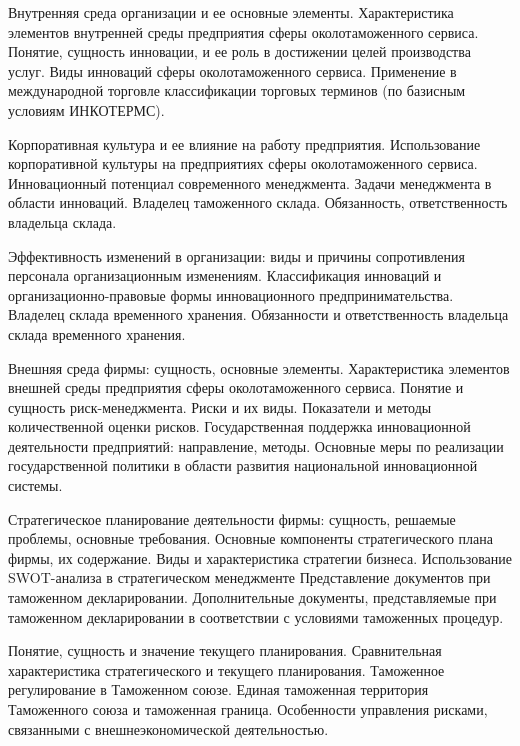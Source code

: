 \documentclass[
	11pt,
	a4paper,
	]
	{article}
\begin{document}
\bigskip

\noindent{} 
	{
		Внутренняя среда организации и ее основные элементы. Характеристика элементов внутренней среды предприятия сферы околотаможенного сервиса.
	}{
		Понятие, сущность инновации, и ее роль в достижении целей производства услуг. Виды инноваций сферы околотаможенного сервиса.
	}{
		Применение в международной торговле классификации торговых терминов (по базисным условиям ИНКОТЕРМС).
	}

\bigskip

\noindent{} 
	{
		Корпоративная культура и ее влияние на работу предприятия. Использование корпоративной культуры на предприятиях сферы околотаможенного сервиса.
	}{
		Инновационный потенциал современного менеджмента. Задачи менеджмента в области инноваций.
	}{
		Владелец таможенного склада. Обязанность, ответственность владельца склада.
	}

\bigskip

\noindent{} 
	{
		Эффективность изменений в организации: виды и причины сопротивления персонала организационным изменениям.
	}{
		Классификация инноваций и организационно-правовые формы инновационного предпринимательства.
	}{
		Владелец склада временного хранения. Обязанности и ответственность владельца склада временного хранения.
	}

\bigskip

\noindent{} 
	{
		Внешняя среда фирмы: сущность, основные элементы. Характеристика элементов внешней среды предприятия сферы околотаможенного сервиса.
	}{
		Понятие и сущность риск-менеджмента. Риски и их виды. Показатели и методы количественной оценки рисков.
	}{
		Государственная поддержка инновационной деятельности предприятий: направление, методы. Основные меры по реализации государственной политики в области развития национальной инновационной системы.
	}

\bigskip

\noindent{} 
	{
		Стратегическое планирование деятельности фирмы: сущность, решаемые проблемы, основные требования. Основные компоненты стратегического плана фирмы, их содержание.
	}{
		Виды и характеристика стратегии бизнеса. Использование SWOT-анализа в стратегическом менеджменте
	}{
		Представление документов при таможенном декларировании. Дополнительные документы, представляемые при таможенном декларировании в соответствии с условиями таможенных процедур.
	}

\bigskip

\noindent{} 
	{
		Понятие, сущность и значение текущего планирования. Сравнительная характеристика стратегического и текущего планирования.
	}{
		Таможенное регулирование в Таможенном союзе. Единая таможенная территория Таможенного союза и таможенная граница.
	}{
		Особенности управления рисками, связанными с внешнеэкономической деятельностью.
	}
\end{document}
